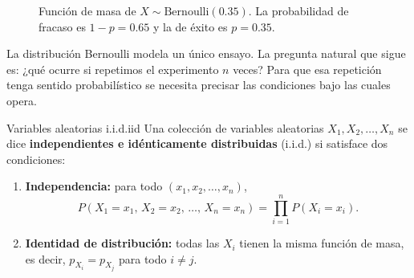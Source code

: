 \documentclass[12pt, a4paper]{book}
\numberwithin{equation}{chapter}
\begin{document}
\begin{figure}[H]
	\centering
	\caption{Función de masa de $X \sim \mathrm{Bernoulli}(0.35)$.
		La probabilidad de fracaso es $1-p = 0.65$ y la de éxito es $p = 0.35$.}
	\label{fig:pmf_bernoulli}
\end{figure}

La distribución Bernoulli modela un único ensayo. La pregunta natural que
sigue es: ¿qué ocurre si repetimos el experimento $n$ veces? Para que esa
repetición tenga sentido probabilístico se necesita precisar las condiciones
bajo las cuales opera.

\begin{definicion}{Variables aleatorias i.i.d.}{iid}
	Una colección de variables aleatorias $X_1, X_2, \ldots, X_n$ se
	dice \textbf{independientes e idénticamente distribuidas} (i.i.d.)
	si satisface dos condiciones:
	\begin{enumerate}[label=\textbf{\roman*)}]
		\item \textbf{Independencia:} para todo $(x_1, x_2, \ldots, x_n)$,
		\[
		P(X_1 = x_1,\, X_2 = x_2,\, \ldots,\, X_n = x_n)
		= \prod_{i=1}^{n} P(X_i = x_i).
		\]
		\item \textbf{Identidad de distribución:} todas las $X_i$ tienen
		la misma función de masa, es decir, $p_{X_i} = p_{X_j}$ para
		todo $i \neq j$.
	\end{enumerate}
\end{definicion}
\end{document}
